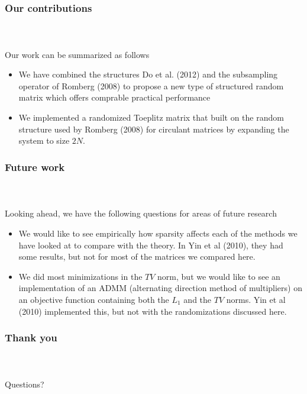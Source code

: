 \begin{frame}[t]
	\frametitle{Our contributions}
	\framesubtitle{~~}  %

	Our work can be summarized as follows
	\begin{itemize}
		\item We have combined the structures Do et al. (2012) and the subsampling operator 
			of Romberg (2008) to propose a new type of structured random matrix which offers 
			comprable practical performance
		\item We implemented a randomized Toeplitz matrix that built on the random structure
			used by Romberg (2008) for circulant matrices by expanding the system to size $2N$.
	\end{itemize}

\end{frame}



\begin{frame}[t]
	\frametitle{Future work}
	\framesubtitle{~~}  %

	Looking ahead, we have the following questions for areas of future research
	\begin{itemize}
		\item We would like to see empirically how sparsity affects each of the methods we 
			have looked at to compare with the theory. In 
			Yin et al (2010), they had some results, but not for most of the matrices we 
			compared here. 
		\item We did most minimizations in the $TV$ norm, but we would like to see an 
			implementation of an ADMM (alternating direction method of multipliers) on an
			objective function containing both the $L_1$ and the $TV$ norms. Yin et al (2010)
			implemented this, but not with the randomizations discussed here. 
	\end{itemize}

\end{frame}

\begin{frame}[t]
	\frametitle{Thank you}
	\framesubtitle{~~}  %
	Questions?
\end{frame}

